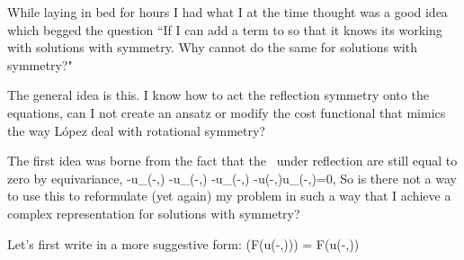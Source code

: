 While laying in bed for hours I had what I at the time thought was a good idea which begged the question
``If I can add a term to  so that it knows its working with solutions
with  symmetry. Why cannot do the same for solutions with  symmetry?"

The general idea is this.
I know how to act the reflection symmetry onto the equations, can I not create
an ansatz or modify the cost functional that mimics the way L{\'o}pez
\etal{} deal with rotational symmetry?

The first idea was borne from the fact that the \KSe\ under reflection are still equal to zero
by equivariance,
\beq
-u_{\zeit}(-\conf,\zeit)
-u_{\conf \conf}(-\conf,\zeit)
-u_{\conf \conf}(-\conf,\zeit)
-u(-\conf,\zeit)u_{\conf}(-\conf,\zeit)=0,
So is there not a way to use this to reformulate (yet again) my problem in such
a way that I achieve a complex representation for solutions with 
symmetry?


Let's first write  in a more suggestive form:
\beq
\exp{\ii \pi}(F(u(-\conf,\zeit))) = \Refl \circ F(u(-\conf,\zeit))
\eeq

